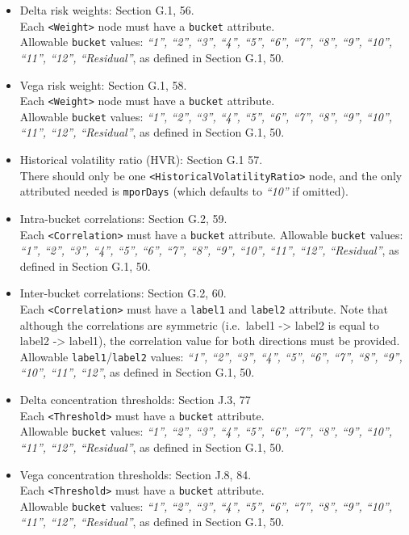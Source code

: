\begin{itemize}
  \item Delta risk weights: Section G.1, 56. \\
    Each {\tt <Weight>} node must have a {\tt bucket} attribute.\\
    Allowable {\tt bucket} values: \emph{``1'', ``2'', ``3'', ``4'', ``5'', ``6'', ``7'', ``8'', ``9'', ``10'', ``11'', ``12'', ``Residual''}, as defined in Section G.1, 50.
  \item Vega risk weight: Section G.1, 58. \\
    Each {\tt <Weight>} node must have a {\tt bucket} attribute. \\
    Allowable {\tt bucket} values: \emph{``1'', ``2'', ``3'', ``4'', ``5'', ``6'', ``7'', ``8'', ``9'', ``10'', ``11'', ``12'', ``Residual''}, as defined in Section G.1, 50.
  \item Historical volatility ratio (HVR): Section G.1 57. \\
    There should only be one {\tt <HistoricalVolatilityRatio>} node, and the only attributed needed is {\tt mporDays} (which defaults to \emph{``10''} if omitted).
  \item Intra-bucket correlations: Section G.2, 59. \\
    Each {\tt <Correlation>} must have a {\tt bucket} attribute.
    Allowable {\tt bucket} values: \emph{``1'', ``2'', ``3'', ``4'', ``5'', ``6'', ``7'', ``8'', ``9'', ``10'', ``11'', ``12'', ``Residual''}, as defined in Section G.1, 50.
  \item Inter-bucket correlations: Section G.2, 60. \\
    Each {\tt <Correlation>} must have a {\tt label1} and {\tt label2} attribute. Note that although the correlations
    are symmetric (i.e.\ label1 -> label2 is equal to label2 -> label1), the correlation value for both directions must be
    provided. \\
    Allowable {\tt label1}/{\tt label2} values: \emph{``1'', ``2'', ``3'', ``4'', ``5'', ``6'', ``7'', ``8'', ``9'', ``10'', ``11'', ``12''}, as defined in Section G.1, 50.
  \item Delta concentration thresholds: Section J.3, 77 \\
    Each {\tt <Threshold>} must have a {\tt bucket} attribute. \\
    Allowable {\tt bucket} values: \emph{``1'', ``2'', ``3'', ``4'', ``5'', ``6'', ``7'', ``8'', ``9'', ``10'', ``11'', ``12'', ``Residual''}, as defined in Section G.1, 50.
  \item Vega concentration thresholds: Section J.8, 84. \\
    Each {\tt <Threshold>} must have a {\tt bucket} attribute. \\
    Allowable {\tt bucket} values: \emph{``1'', ``2'', ``3'', ``4'', ``5'', ``6'', ``7'', ``8'', ``9'', ``10'', ``11'', ``12'', ``Residual''}, as defined in Section G.1, 50.
\end{itemize}

